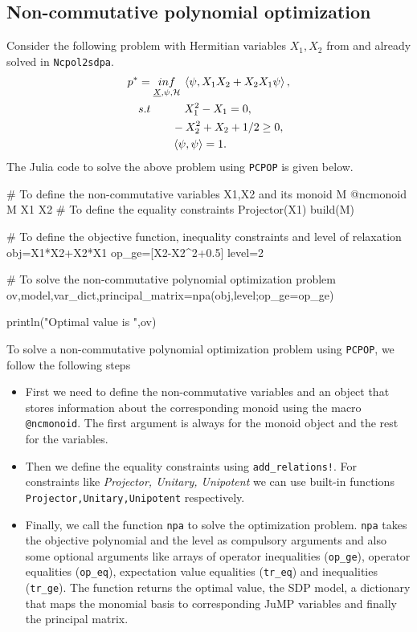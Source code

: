 \subsection{Non-commutative polynomial optimization}
\label{sec:ncpop}
\begin{example}
Consider the following problem with Hermitian variables $X_1,X_2$ from \cite{doi:10.1137/090760155} and already solved in \texttt{Ncpol2sdpa}\cite{10.1145/2699464}.
\begin{equation}
  \label{ncpop_pna}
\begin{split}
       p^* &=\underset{\underline{X} , \psi , \mathcal{H}}{inf} \: \braket{\psi, X_1  X_2 + X_2  X_1\psi}, \\
    & s.t \quad \qquad X_1^2 - X_1 = 0, \\
    & \qquad \quad -X_2^2+X_2+1/2 \geq 0, \\
    & \qquad \quad \braket{\psi , \psi} = 1. \\ 
\end{split}
\end{equation} 
The Julia code to solve the above problem using \texttt{PCPOP} is given below.
\begin{code}
    # To define the non-commutative variables X1,X2 and its monoid M
    @ncmonoid M X1 X2
    #  To define the equality constraints
    Projector(X1)
    build(M)

    # To define the objective function, inequality constraints and level of relaxation
    obj=X1*X2+X2*X1
    op_ge=[X2-X2^2+0.5]
    level=2

    # To solve the non-commutative polynomial optimization problem
    ov,model,var_dict,principal_matrix=npa(obj,level;op_ge=op_ge)

    println("Optimal value is ",ov)
\end{code}
\end{example}
To solve a non-commutative polynomial optimization problem using \texttt{PCPOP}, we follow the following steps 
\begin{itemize}
    \item First we need to define the non-commutative variables and an object that stores information about the corresponding monoid using the macro \texttt{@ncmonoid}. The first argument is always for the monoid object and the rest for the variables. 
    \item Then we define the equality constraints using \texttt{add\_relations!}. For constraints like \emph{Projector, Unitary, Unipotent} we can use built-in functions \texttt{Projector,Unitary,Unipotent} respectively. 
    \item Finally, we call the function \texttt{npa} to solve the optimization problem. \texttt{npa} takes the objective polynomial and the level as compulsory arguments and also some optional arguments like arrays of operator inequalities (\texttt{op\_ge}), operator equalities (\texttt{op\_eq}), expectation value equalities (\texttt{tr\_eq}) and inequalities (\texttt{tr\_ge}). The function returns the optimal value, the SDP model, a dictionary that maps the monomial basis to corresponding JuMP variables and finally the principal matrix.
\end{itemize}
